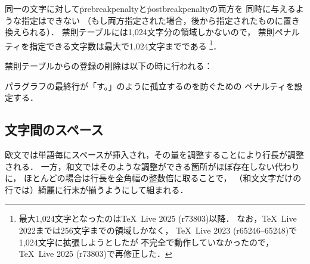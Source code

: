 \documentclass[a4paper,11pt,nomag,dvipdfmx]{jsarticle}
\begin{document}
同一の文字に対して\.{prebreakpenalty}と\.{postbreakpenalty}の両方を
同時に与えるような指定はできない
（もし両方指定された場合，後から指定されたものに置き換えられる）．
禁則テーブルには1,024文字分の領域しかないので，
禁則ペナルティを指定できる文字数は最大で1,024文字までである
\footnote{最大1,024文字となったのは\TeX~Live 2025 (r73803)以降．
なお，\TeX~Live 2022までは256文字までの領域しかなく，
\TeX~Live 2023 (r65246--65248)で1,024文字に拡張しようとしたが
不完全で動作していなかったので，\TeX~Live 2025 (r73803)で再修正した．}．

禁則テーブルからの登録の削除は以下の時に行われる\cite{tjb26,tjb57}：

\begin{cslist}
\csitem[\.{jcharwidowpenalty}=<number>]
  パラグラフの最終行が「す。」のように孤立するのを防ぐための
  ペナルティを設定する．
\end{cslist}

\subsection{文字間のスペース}
欧文では単語毎にスペースが挿入され，その量を調整することにより行長が調整される．
一方，和文ではそのような調整ができる箇所がほぼ存在しない代わりに，
ほとんどの場合は行長を全角幅の整数倍に取ることで，
（和文文字だけの行では）綺麗に行末が揃うようにして組まれる．
\end{document}
